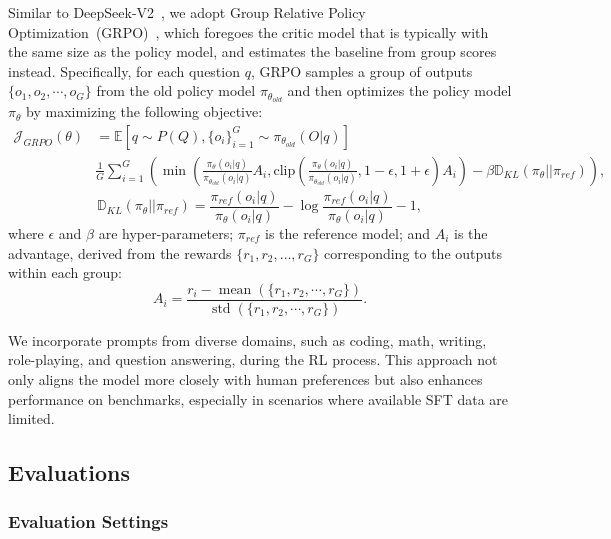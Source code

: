 \documentclass[11pt, a4paper, logo, copyright, nonumbering]{deepseek}
\newcommand{\dsvii}{DeepSeek-V2}
\begin{document}
\begin{CJK*}{UTF8}{gbsn}
Similar to \dsvii{}~\citep{dsvii}, we adopt Group Relative Policy Optimization~(GRPO)~\citep{deepseekmath}, which foregoes the critic model that is typically with the same size as the policy model, and estimates the baseline from group scores instead. 
Specifically, for each question $q$, GRPO samples a group of outputs $\{o_1, o_2, \cdots, o_G\}$ from the old policy model $\pi_{\theta_{old}}$ and then optimizes the policy model $\pi_{\theta}$ by maximizing the following objective:
\begin{equation}
\begin{split}
    \mathcal{J}_{GRPO}(\theta) &= \mathbb{E}{[q \sim P(Q), \{o_i\}_{i=1}^G \sim \pi_{\theta_{old}}(O|q)]}  \\
    & \frac{1}{G}\sum_{i=1}^G \left( \min \left( \frac{\pi_\theta(o_i |q)}{\pi_{\theta_{old}}(o_i |q)} A_i, \text{clip} \left( \frac{\pi_\theta(o_i |q)}{\pi_{\theta_{old}}(o_i |q)}, 1 - \epsilon, 1 + \epsilon \right)  A_i \right) - \beta \mathbb{D}_{KL}\left(\pi_{\theta} || \pi_{ref}\right)\right) ,
\end{split}
\label{eq:GRPO-obj}
\end{equation}
\begin{equation}
    \mathbb{D}_{KL}\left(\pi_{\theta} || \pi_{ref}\right) = \frac{\pi_{ref}(o_i|q)}{\pi_{\theta}(o_i|q)}- \log\frac{\pi_{ref}(o_i|q)}{\pi_{\theta}(o_i|q)} - 1,
\end{equation}
where $\epsilon$ and $\beta$ are hyper-parameters; 
$\pi_{ref}$ is the reference model; 
and $A_i$ is the advantage, derived from the rewards $\{r_1, r_2, \ldots, r_G\}$ corresponding to the outputs within each group:
\begin{equation}
    A_i = \frac{r_i - {\operatorname{mean}(\{r_1, r_2, \cdots, r_G\})}}{{\operatorname{std}(\{r_1, r_2, \cdots, r_G\})}}.
\end{equation}

We incorporate prompts from diverse domains, such as coding, math, writing, role-playing, and question answering, during the RL process. 
This approach not only aligns the model more closely with human preferences but also enhances performance on benchmarks, especially in scenarios where available SFT data are limited.

\subsection{Evaluations}

\subsubsection{Evaluation Settings}


\end{CJK*}
\end{document}
